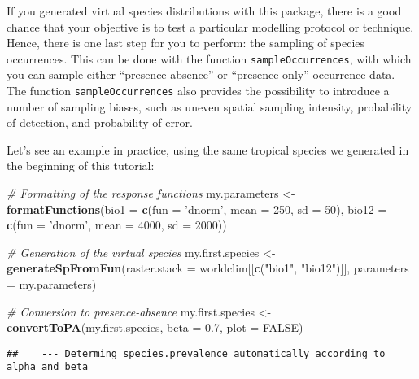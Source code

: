 \documentclass[]{article}
\newenvironment{Shaded}{\begin{snugshade}}{\end{snugshade}}
\newcommand{\KeywordTok}[1]{\textcolor[rgb]{0.13,0.29,0.53}{\textbf{#1}}}
\newcommand{\DataTypeTok}[1]{\textcolor[rgb]{0.13,0.29,0.53}{#1}}
\newcommand{\DecValTok}[1]{\textcolor[rgb]{0.00,0.00,0.81}{#1}}
\newcommand{\FloatTok}[1]{\textcolor[rgb]{0.00,0.00,0.81}{#1}}
\newcommand{\StringTok}[1]{\textcolor[rgb]{0.31,0.60,0.02}{#1}}
\newcommand{\CommentTok}[1]{\textcolor[rgb]{0.56,0.35,0.01}{\textit{#1}}}
\newcommand{\OtherTok}[1]{\textcolor[rgb]{0.56,0.35,0.01}{#1}}
\newcommand{\NormalTok}[1]{#1}
\begin{document}
If you generated virtual species distributions with this package, there
is a good chance that your objective is to test a particular modelling
protocol or technique. Hence, there is one last step for you to perform:
the sampling of species occurrences. This can be done with the function
\texttt{sampleOccurrences}, with which you can sample either
``presence-absence'' or ``presence only'' occurrence data. The function
\texttt{sampleOccurrences} also provides the possibility to introduce a
number of sampling biases, such as uneven spatial sampling intensity,
probability of detection, and probability of error.

Let's see an example in practice, using the same tropical species we
generated in the beginning of this tutorial:

\begin{Shaded}
\begin{Highlighting}[]
\CommentTok{# Formatting of the response functions}
\NormalTok{my.parameters <-}\StringTok{ }\KeywordTok{formatFunctions}\NormalTok{(}\DataTypeTok{bio1 =} \KeywordTok{c}\NormalTok{(}\DataTypeTok{fun =} \StringTok{'dnorm'}\NormalTok{, }\DataTypeTok{mean =} \DecValTok{250}\NormalTok{, }\DataTypeTok{sd =} \DecValTok{50}\NormalTok{),}
                                 \DataTypeTok{bio12 =} \KeywordTok{c}\NormalTok{(}\DataTypeTok{fun =} \StringTok{'dnorm'}\NormalTok{, }\DataTypeTok{mean =} \DecValTok{4000}\NormalTok{, }\DataTypeTok{sd =} \DecValTok{2000}\NormalTok{))}

\CommentTok{# Generation of the virtual species}
\NormalTok{my.first.species <-}\StringTok{ }\KeywordTok{generateSpFromFun}\NormalTok{(}\DataTypeTok{raster.stack =}\NormalTok{ worldclim[[}\KeywordTok{c}\NormalTok{(}\StringTok{"bio1"}\NormalTok{, }\StringTok{"bio12"}\NormalTok{)]],}
                                      \DataTypeTok{parameters =}\NormalTok{ my.parameters)}

\CommentTok{# Conversion to presence-absence}
\NormalTok{my.first.species <-}\StringTok{ }\KeywordTok{convertToPA}\NormalTok{(my.first.species,}
                                \DataTypeTok{beta =} \FloatTok{0.7}\NormalTok{, }\DataTypeTok{plot =} \OtherTok{FALSE}\NormalTok{)}
\end{Highlighting}
\end{Shaded}

\begin{verbatim}
##    --- Determing species.prevalence automatically according to alpha and beta
\end{verbatim}
\end{document}

